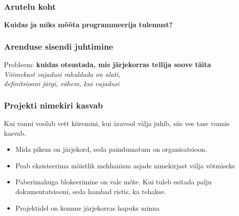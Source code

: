 \begin{frame}[fragile]
  \frametitle{Arutelu koht}
		\begin{center}
			\textbf{Kuidas ja miks mõõta programmeerija tulemust?}
		\end{center}
\end{frame}

\begin{frame}[fragile]
  \frametitle{Arenduse sisendi juhtimine}
  \begin{center}
	  Probleem: \textbf{kuidas otsustada, mis järjekorras tellija soove täita}
		\\[3mm]
	\emph{Võimekust vajadusi rahuldada on alati, \\definitsiooni järgi, vähem, kui vajadusi}
  \end{center}
\end{frame}
    
\begin{frame}[fragile]
  \frametitle{Projekti nimekiri kasvab}
  Kui vanni voolab vett kiiremini, kui äravool välja juhib, siis vee tase vannis kasvab.
		\begin{itemize}
			\item Mida pikem on järjekord, seda paindumatum on organisatsioon. 
			\item Peab eksisteerima mõistlik mehhanism asjade nimekirjast välja võtmiseks
			\item Paberimahuga blokeerimine on vale mõte. Kui tuleb esitada palju dokumentatsiooni, seda hambad ristis, ka tehakse. 
			\item Projektidel on komme järjekorras hapuks minna
		\end{itemize}
\end{frame}

